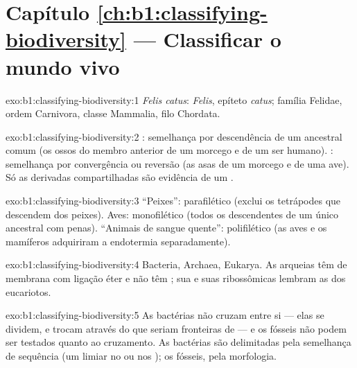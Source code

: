 \section*{Capítulo \ref{ch:b1:classifying-biodiversity} --- Classificar o mundo vivo}

\begin{solution}{exo:b1:classifying-biodiversity:1}
\emph{Felis catus}:  \emph{Felis}, epíteto \emph{catus}; família
Felidae, ordem Carnivora, classe Mammalia, filo Chordata.
\end{solution}

\begin{solution}{exo:b1:classifying-biodiversity:2}
: semelhança por descendência de um ancestral comum (os ossos
do membro anterior de um morcego e de um ser humano). :
semelhança por convergência ou reversão (as asas de um morcego e de
uma ave). Só as  derivadas compartilhadas são evidência de
um .
\end{solution}

\begin{solution}{exo:b1:classifying-biodiversity:3}
``Peixes'': parafilético (exclui os tetrápodes que descendem dos
peixes). Aves: monofilético (todos os descendentes de um único
ancestral com penas). ``Animais de sangue quente'': polifilético (as
aves e os mamíferos adquiriram a endotermia separadamente).
\end{solution}

\begin{solution}{exo:b1:classifying-biodiversity:4}
Bacteria, Archaea, Eukarya. As arqueias têm  de membrana com
ligação éter e não têm ; sua  e suas
 ribossômicas lembram as dos eucariotos.
\end{solution}

\begin{solution}{exo:b1:classifying-biodiversity:5}
As bactérias não cruzam entre si --- elas se dividem, e trocam 
através do que seriam fronteiras de  --- e os fósseis não podem
ser testados quanto ao cruzamento. As bactérias são delimitadas pela
semelhança de sequência (um limiar no  ou nos );
os fósseis, pela morfologia.
\end{solution}

